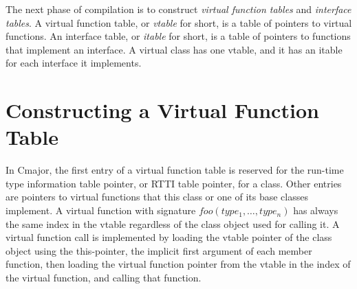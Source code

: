 \documentclass[a4paper,oneside,11pt]{book}
\theoremstyle{definition}
\begin{document}
The next phase of compilation is to construct \emph{virtual function tables} and \emph{interface tables}.
A virtual function table, or \emph{vtable} for short, is a table of pointers to virtual functions.
An interface table, or \emph{itable} for short, is a table of pointers to functions that implement an interface.
A virtual class has one vtable, and it has an itable for each interface it implements.

\section{Constructing a Virtual Function Table}

In Cmajor, the first entry of a virtual function table is reserved for the run-time type information table pointer, or RTTI table pointer, for a class.
Other entries are pointers to virtual functions that this class or one of its base classes implement.
A virtual function with signature $foo(type_1, \ldots, type_n)$ has always the same index in the vtable regardless of the class object used for calling it.
A virtual function call is implemented by loading the vtable pointer of the class object using the this-pointer,
the implicit first argument of each member function, then loading the virtual function pointer from the vtable in the index of the virtual function,
and calling that function.
\end{document}
